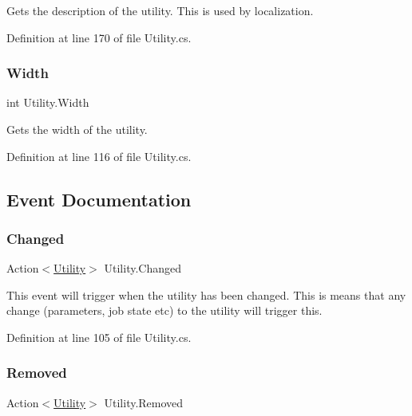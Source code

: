 Gets the description of the utility. This is used by localization. 



Definition at line 170 of file Utility.\+cs.

\mbox{\label{class_utility_a8ca5cdd9830db40c5a4d424eb65c31a5}} 
\subsubsection{\texorpdfstring{Width}{Width}}
{\footnotesize\ttfamily int Utility.\+Width\hspace{0.3cm}{\ttfamily [get]}}



Gets the width of the utility. 



Definition at line 116 of file Utility.\+cs.



\subsection{Event Documentation}
\mbox{\label{class_utility_ae0af28441e3bed8aa3529c9b5a3836cc}} 
\subsubsection{\texorpdfstring{Changed}{Changed}}
{\footnotesize\ttfamily Action$<$\hyperlink{class_utility}{Utility}$>$ Utility.\+Changed}



This event will trigger when the utility has been changed. This is means that any change (parameters, job state etc) to the utility will trigger this. 



Definition at line 105 of file Utility.\+cs.

\mbox{\label{class_utility_ab1e23864eb68be882ac5acc52d26552a}} 
\subsubsection{\texorpdfstring{Removed}{Removed}}
{\footnotesize\ttfamily Action$<$\hyperlink{class_utility}{Utility}$>$ Utility.\+Removed}



